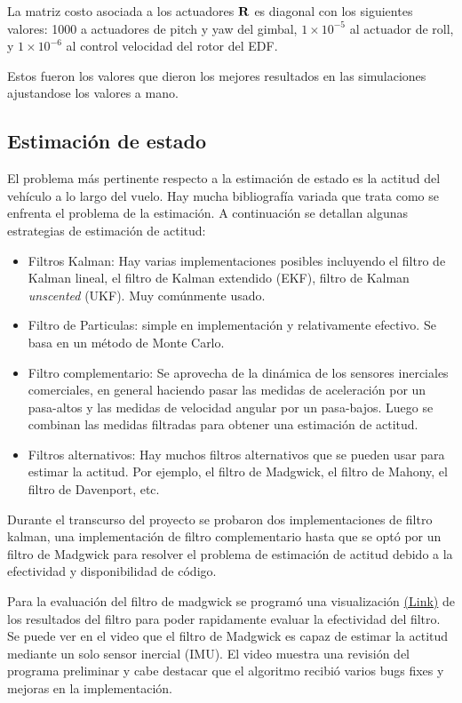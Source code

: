 \medskip

La matriz costo asociada a los actuadores $\mathbf{R}$ es diagonal con los siguientes valores: 1000 a actuadores de pitch y yaw del gimbal, $1\times10^{-5}$ al actuador de roll, y $1\times10^{-6}$ al control velocidad del rotor del EDF.

Estos fueron los valores que dieron los mejores resultados en las simulaciones ajustandose los valores a mano.

\subsection{Estimación de estado}
El problema más pertinente respecto a la estimación de estado es la actitud del vehículo a lo largo del vuelo. Hay mucha bibliografía variada que trata como se enfrenta el problema de la estimación. A continuación se detallan algunas estrategias de estimación de actitud:

\begin{itemize}
    \item Filtros Kalman: Hay varias implementaciones posibles incluyendo el filtro de Kalman lineal, el filtro de Kalman extendido (EKF), filtro de Kalman \textit{unscented} (UKF). Muy comúnmente usado.
    \item Filtro de Particulas: simple en implementación y relativamente efectivo. Se basa en un método de Monte Carlo.
    \item Filtro complementario: Se aprovecha de la dinámica de los sensores inerciales comerciales, en general haciendo pasar las medidas de aceleración por un pasa-altos y las medidas de velocidad angular por un pasa-bajos. Luego se combinan las medidas filtradas para obtener una estimación de actitud.
    \item Filtros alternativos: Hay muchos filtros alternativos que se pueden usar para estimar la actitud. Por ejemplo, el filtro de Madgwick, el filtro de Mahony, el filtro de Davenport, etc.
\end{itemize}

Durante el transcurso del proyecto se probaron dos implementaciones de filtro kalman, una implementación de filtro complementario hasta que se optó por un filtro de Madgwick para resolver el problema de estimación de actitud debido a la efectividad y disponibilidad de código.

Para la evaluación del filtro de madgwick se programó una visualización \href{https://www.youtube.com/watch?v=M0_s6UW86cs&ab_channel=PatricioWhittingslow}{(Link)} de los resultados del filtro para poder rapidamente evaluar la efectividad del filtro. Se puede ver en el video que el filtro de Madgwick es capaz de estimar la actitud mediante un solo sensor inercial (IMU). El video muestra una revisión del programa preliminar y cabe destacar que el algoritmo recibió varios bugs fixes y mejoras en la implementación. 

